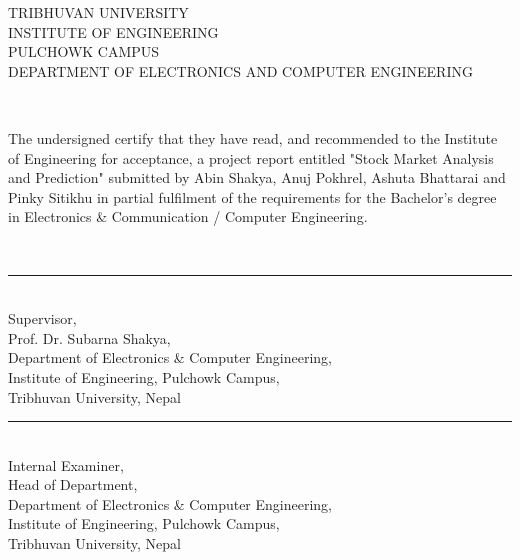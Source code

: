 
 {}

{
  \centering

  TRIBHUVAN UNIVERSITY\\
  INSTITUTE OF ENGINEERING\\
  PULCHOWK CAMPUS\\
  DEPARTMENT OF ELECTRONICS AND COMPUTER ENGINEERING\\
}

~

The undersigned certify that they have read, and recommended to the Institute of
Engineering for acceptance, a project report entitled "Stock Market Analysis and Prediction" submitted by Abin Shakya, Anuj Pokhrel, Ashuta Bhattarai and Pinky Sitikhu in partial fulfilment of the requirements for the Bachelor's degree in
Electronics \& Communication / Computer Engineering.  

~

\begin{minipage}[t]{0.55\textwidth}
  \rule{2in}{1pt}\\
  Supervisor,\\
  Prof. Dr. Subarna Shakya,\\
  \small
  Department of Electronics \& Computer Engineering,\\
  Institute of Engineering, Pulchowk Campus,\\
  Tribhuvan University, Nepal
\end{minipage}
\hspace{0.5cm}
\begin{minipage}[t]{0.40\textwidth}
  \rule{2in}{1pt}\\
  Internal Examiner,\\
  Head of Department,\\
  \small
  Department of Electronics \& Computer Engineering,\\
  Institute of Engineering, Pulchowk Campus,\\
  Tribhuvan University, Nepal
\end{minipage}

~

~

